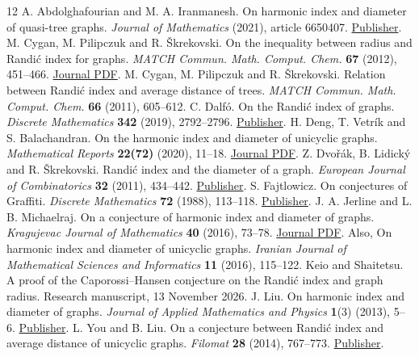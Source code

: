 \documentclass[11pt,a4paper]{article}
\begin{document}
\begin{thebibliography}{12}
 A. Abdolghafourian and M. A. Iranmanesh.
On harmonic index and diameter of quasi-tree graphs.
\emph{Journal of Mathematics} (2021), article 6650407.
\href{https://doi.org/10.1155/2021/6650407}{Publisher}.
 M. Cygan, M. Pilipczuk and R. \v{S}krekovski.
On the inequality between radius and Randi\'c index for graphs.
\emph{MATCH Commun. Math. Comput. Chem.} \textbf{67} (2012), 451--466.
\href{https://match.pmf.kg.ac.rs/electronic_versions/Match67/n2/match67n2_451-466.pdf}{Journal PDF}.
 M. Cygan, M. Pilipczuk and R. \v{S}krekovski.
Relation between Randi\'c index and average distance of trees.
\emph{MATCH Commun. Math. Comput. Chem.} \textbf{66} (2011), 605--612.
 C. Dalf\'o. On the Randi\'c index of graphs.
\emph{Discrete Mathematics} \textbf{342} (2019), 2792--2796.
\href{https://doi.org/10.1016/j.disc.2018.08.020}{Publisher}.
 H. Deng, T. Vetr\'ik and S. Balachandran.
On the harmonic index and diameter of unicyclic graphs.
\emph{Mathematical Reports} \textbf{22(72)} (2020), 11--18.
\href{https://imar.ro/journals/Mathematical_Reports/Pdfs/2020/1/2.pdf}{Journal PDF}.
 Z. Dvo\v{r}\'ak, B. Lidick\'y and R. \v{S}krekovski.
Randi\'c index and the diameter of a graph.
\emph{European Journal of Combinatorics} \textbf{32} (2011), 434--442.
\href{https://doi.org/10.1016/j.ejc.2010.12.002}{Publisher}.
 S. Fajtlowicz. On conjectures of Graffiti.
\emph{Discrete Mathematics} \textbf{72} (1988), 113--118.
\href{https://doi.org/10.1016/0012-365X(88)90199-9}{Publisher}.
 J. A. Jerline and L. B. Michaelraj.
On a conjecture of harmonic index and diameter of graphs.
\emph{Kragujevac Journal of Mathematics} \textbf{40} (2016), 73--78.
\href{https://imi.pmf.kg.ac.rs/kjm/pub/kjom40/kjm_40_1-6.pdf}{Journal PDF}.
Also, On harmonic index and diameter of unicyclic graphs.
\emph{Iranian Journal of Mathematical Sciences and Informatics} \textbf{11}
(2016), 115--122.
 Keio and Shaitetsu.
A proof of the Caporossi--Hansen conjecture on the Randi\'c index and
graph radius. Research manuscript, 13 November 2026.
 J. Liu. On harmonic index and diameter of graphs.
\emph{Journal of Applied Mathematics and Physics} \textbf{1}(3) (2013), 5--6.
\href{https://doi.org/10.4236/jamp.2013.13002}{Publisher}.
 L. You and B. Liu.
On a conjecture between Randi\'c index and average distance of unicyclic graphs.
\emph{Filomat} \textbf{28} (2014), 767--773.
\href{https://doi.org/10.2298/FIL1404767Y}{Publisher}.
\end{thebibliography}
\end{document}

